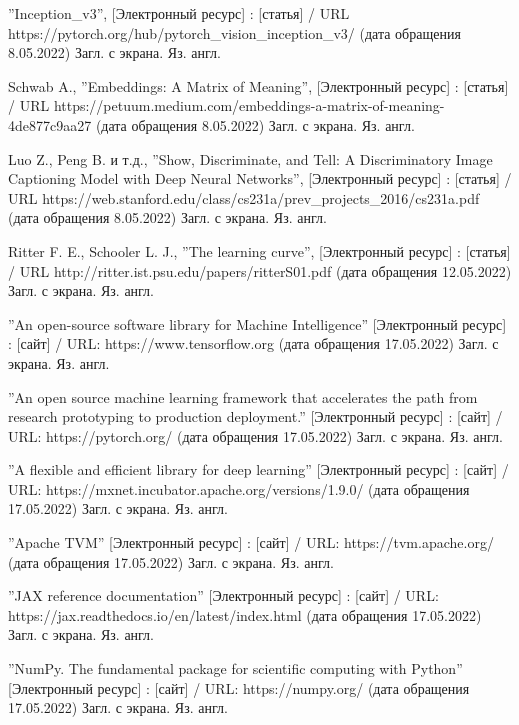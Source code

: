 \documentclass[bachelor, och, coursework]{SCWorks}
\begin{document}
\begin{thebibliography}{99}
     ''Inception_v3'', [Электронный ресурс] : [статья] / URL
    https://pytorch.org/hub/pytorch_vision_inception_v3/ (дата обращения
    8.05.2022) Загл. с экрана. Яз. англ.


     Schwab A., ''Embeddings: A Matrix of Meaning'',
    [Электронный ресурс] : [статья] / URL
    https://petuum.medium.com/embeddings-a-matrix-of-meaning-4de877c9aa27 (дата
    обращения 8.05.2022) Загл. с экрана. Яз. англ.

     Luo Z., Peng B. и т.д., ''Show, Discriminate, and
    Tell: A Discriminatory Image Captioning Model with Deep Neural Networks'',
    [Электронный ресурс] : [статья] / URL
    https://web.stanford.edu/class/cs231a/prev_projects_2016/cs231a.pdf (дата
    обращения 8.05.2022) Загл. с экрана. Яз. англ.

    
     Ritter F. E., Schooler L. J., ''The learning curve'',
    [Электронный ресурс] : [статья] / URL
    http://ritter.ist.psu.edu/papers/ritterS01.pdf (дата обращения 12.05.2022)
    Загл. с экрана. Яз. англ.

     ''An open-source software library for Machine Intelligence''
    [Электронный ресурс] : [сайт] / URL: https://www.tensorflow.org (дата
    обращения 17.05.2022) Загл. с экрана. Яз. англ.

     ''An open source machine learning framework that
    accelerates the path from research prototyping to production deployment.''
    [Электронный ресурс] : [сайт] / URL: https://pytorch.org/ (дата обращения
    17.05.2022) Загл. с экрана. Яз. англ.

     ''A flexible and efficient library for deep learning''
    [Электронный ресурс] : [сайт] / URL:
    https://mxnet.incubator.apache.org/versions/1.9.0/ (дата обращения
    17.05.2022) Загл. с экрана. Яз. англ.

     ''Apache TVM'' [Электронный ресурс] : [сайт] / URL:
    https://tvm.apache.org/ (дата обращения 17.05.2022) Загл. с экрана. Яз.
    англ.

     ''JAX reference documentation'' [Электронный ресурс] :
    [сайт] / URL: https://jax.readthedocs.io/en/latest/index.html (дата
    обращения 17.05.2022) Загл. с экрана. Яз. англ.

     ''NumPy. The fundamental package for scientific computing
    with Python'' [Электронный ресурс] : [сайт] / URL: https://numpy.org/ (дата
    обращения 17.05.2022) Загл. с экрана. Яз. англ.


\end{thebibliography}
\end{document}
